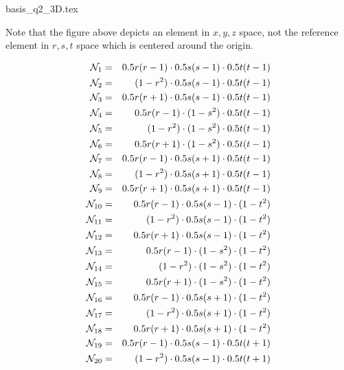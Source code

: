 \begin{flushright} {\tiny {\color{gray} basis\_q2\_3D.tex}} \end{flushright}

\begin{center}

\end{center}
Note that the figure above depicts an element in $x,y,z$ space, not the reference
element in $r,s,t$ space which is centered around the origin.

\begin{eqnarray}
\bN_{1} &=& 0.5r(r-1)  \cdot 0.5s(s-1) \cdot 0.5t(t-1) \nn\\
\bN_{2} &=& (1-r^2)    \cdot 0.5s(s-1) \cdot 0.5t(t-1) \nn\\
\bN_{3} &=& 0.5r(r+1)  \cdot 0.5s(s-1) \cdot 0.5t(t-1) \nn\\
\bN_{4} &=&  0.5r(r-1) \cdot (1-s^2)   \cdot 0.5t(t-1) \nn\\
\bN_{5} &=&  (1-r^2)   \cdot (1-s^2)   \cdot 0.5t(t-1) \nn\\
\bN_{6} &=& 0.5r(r+1)  \cdot (1-s^2)   \cdot 0.5t(t-1) \nn\\
\bN_{7} &=&  0.5r(r-1) \cdot 0.5s(s+1) \cdot 0.5t(t-1) \nn\\
\bN_{8} &=&  (1-r^2)   \cdot 0.5s(s+1) \cdot 0.5t(t-1) \nn\\
\bN_{9} &=& 0.5r(r+1)  \cdot 0.5s(s+1) \cdot 0.5t(t-1) \nn\\
\bN_{10}&=&  0.5r(r-1) \cdot 0.5s(s-1) \cdot (1-t^2) \nn\\
\bN_{11}&=&  (1-r^2)   \cdot 0.5s(s-1) \cdot (1-t^2) \nn\\
\bN_{12}&=& 0.5r(r+1)  \cdot 0.5s(s-1) \cdot (1-t^2) \nn\\
\bN_{13}&=&  0.5r(r-1) \cdot (1-s^2)   \cdot (1-t^2) \nn\\
\bN_{14}&=&  (1-r^2)   \cdot (1-s^2)   \cdot (1-t^2) \nn\\
\bN_{15}&=& 0.5r(r+1)  \cdot (1-s^2)   \cdot (1-t^2) \nn\\
\bN_{16}&=&  0.5r(r-1) \cdot 0.5s(s+1) \cdot (1-t^2) \nn\\
\bN_{17}&=&  (1-r^2)   \cdot 0.5s(s+1) \cdot (1-t^2) \nn\\
\bN_{18}&=& 0.5r(r+1)  \cdot 0.5s(s+1) \cdot (1-t^2) \nn\\
\bN_{19}&=&  0.5r(r-1) \cdot 0.5s(s-1) \cdot 0.5t(t+1) \nn\\
\bN_{20}&=&  (1-r^2)   \cdot 0.5s(s-1) \cdot 0.5t(t+1) \nn\\

\end{eqnarray}
